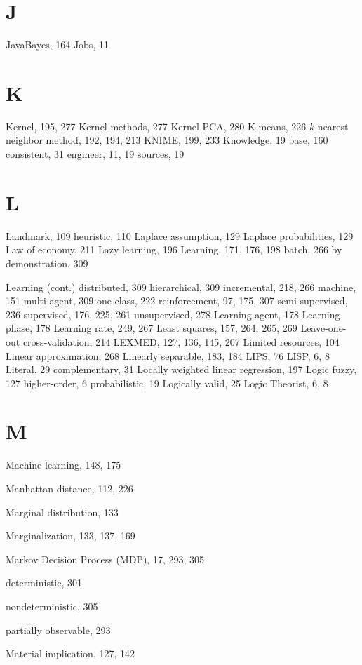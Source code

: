 \documentclass[10pt]{book}
\begin{document}
\section{J}

JavaBayes, 164
Jobs, 11

\section{K}

Kernel, 195, 277
Kernel methods, 277
Kernel PCA, 280
K-means, 226
$k$-nearest neighbor method, 192, 194, 213
KNIME, 199, 233
Knowledge, 19
base, 160
consistent, 31
engineer, 11, 19
sources, 19

\section{L}

Landmark, 109
heuristic, 110
Laplace assumption, 129
Laplace probabilities, 129
Law of economy, 211
Lazy learning, 196
Learning, 171, 176, 198
batch, 266
by demonstration, 309

Learning (cont.)
distributed, 309
hierarchical, 309
incremental, 218, 266
machine, 151
multi-agent, 309
one-class, 222
reinforcement, 97, 175, 307
semi-supervised, 236
supervised, 176, 225, 261
unsupervised, 278
Learning agent, 178
Learning phase, 178
Learning rate, 249, 267
Least squares, 157, 264, 265, 269
Leave-one-out cross-validation, 214
LEXMED, 127, 136, 145, 207
Limited resources, 104
Linear approximation, 268
Linearly separable, 183, 184
LIPS, 76
LISP, 6, 8
Literal, 29
complementary, 31
Locally weighted linear regression, 197
Logic
fuzzy, 127
higher-order, 6
probabilistic, 19
Logically valid, 25
Logic Theorist, 6, 8
\section{M}

Machine learning, 148, 175

Manhattan distance, 112, 226

Marginal distribution, 133

Marginalization, 133, 137, 169

Markov Decision Process (MDP), 17, 293, 305

deterministic, 301

nondeterministic, 305

partially observable, 293

Material implication, 127, 142
\end{document}
